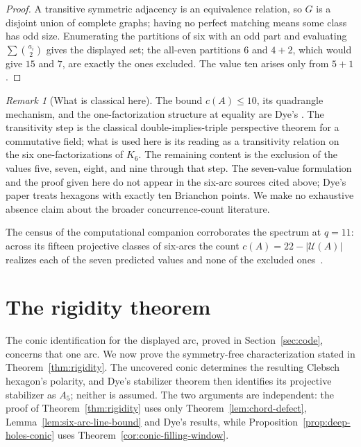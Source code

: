 \documentclass[11pt]{article}
\theoremstyle{definition}
\theoremstyle{remark}
\newtheorem{remark}[theorem]{Remark}
\newcommand{\cU}{\mathcal{U}}
\begin{document}
\begin{proof}
A transitive symmetric adjacency is an equivalence relation, so $G$ is a
disjoint union of complete graphs; having no perfect matching means some
class has odd size.  Enumerating the partitions of six with an odd part and
evaluating $\sum\binom{a_i}{2}$ gives the displayed set; the all-even
partitions $6$ and $4+2$, which would give $15$ and $7$, are exactly the
ones excluded.  The value ten arises only from $5+1$.
\end{proof}

\begin{remark}[What is classical here]
The bound $c(A)\le10$, its quadrangle mechanism, and the one-factorization
structure at equality are Dye's \cite[\S2.2 and the proof of Theorem~1,
pp.~274--275]{Dye1991}.  The transitivity step is the classical
double-implies-triple perspective theorem for a commutative field; what is
used here is its reading as a transitivity relation on the six
one-factorizations of $K_6$.  The remaining content is the exclusion of the
values five, seven, eight, and nine through that step. The seven-value
formulation and the proof given here do not appear in the six-arc sources
cited above; Dye's paper treats hexagons with exactly ten Brianchon points.
We make no exhaustive absence claim about the broader concurrence-count
literature.

The census of the computational companion corroborates the spectrum at
$q=11$: across its fifteen projective classes of six-arcs the count
$c(A)=22-|\cU(A)|$ realizes each of the seven predicted values and none of
the excluded ones~\cite{RuddComputational2026}.
\end{remark}

\section{The rigidity theorem}
\label{sec:rigidity}

The conic identification for the displayed arc, proved in
Section~\ref{sec:code}, concerns that one arc.  We now prove the
symmetry-free characterization stated in Theorem~\ref{thm:rigidity}.  The
uncovered conic determines the resulting Clebsch hexagon's polarity, and
Dye's stabilizer theorem then identifies its projective stabilizer as
$A_5$; neither is assumed.  The two arguments are independent: the proof of
Theorem~\ref{thm:rigidity} uses only Theorem~\ref{lem:chord-defect},
Lemma~\ref{lem:six-arc-line-bound} and Dye's results, while
Proposition~\ref{prop:deep-holes-conic} uses
Theorem~\ref{cor:conic-filling-window}.
\end{document}
